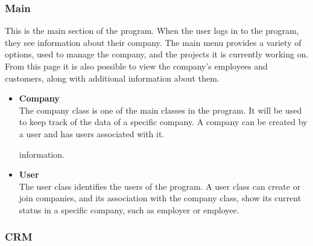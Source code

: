 \subsubsection*{Main}
This is the main section of the program. When the user logs in to the program, they see information about their company. The main menu provides a variety of options, used to manage the company, and the projects it is currently working on. From this page it is also possible to view the company's employees and customers, along with additional information about them.

\begin{itemize}
  \item \textbf{Company} \\
 The company class is one of the main classes in the program. It will be used to keep track of the data of a specific company. A company can be created by a user and has users associated with it.
  
  
  
  
   information. 
  \item \textbf{User} \\
The user class identifies the users of the program. A user class can create or join companies, and its association with the company class, show its current status in a specific company, such as employer or employee.
  
\end{itemize}

\subsubsection*{CRM}

